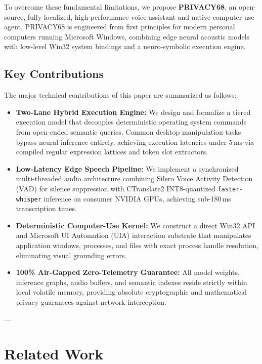 \documentclass[conference]{IEEEtran}
\begin{document}
To overcome these fundamental limitations, we propose \textbf{PRIVACY68}, an open-source, fully localized, high-performance voice assistant and native computer-use agent. PRIVACY68 is engineered from first principles for modern personal computers running Microsoft Windows, combining edge neural acoustic models with low-level Win32 system bindings and a neuro-symbolic execution engine.

\subsection{Key Contributions}
The major technical contributions of this paper are summarized as follows:
\begin{itemize}
    \item \textbf{Two-Lane Hybrid Execution Engine:} We design and formalize a tiered execution model that decouples deterministic operating system commands from open-ended semantic queries. Common desktop manipulation tasks bypass neural inference entirely, achieving execution latencies under 5\,ms via compiled regular expression lattices and token slot extractors.
    \item \textbf{Low-Latency Edge Speech Pipeline:} We implement a synchronized multi-threaded audio architecture combining Silero Voice Activity Detection (VAD) \cite{silerovad2021} for silence suppression with CTranslate2 INT8-quantized \texttt{faster-whisper} \cite{radford2023robust, klein2020ctranslate2} inference on consumer NVIDIA GPUs, achieving sub-180\,ms transcription times.
    \item \textbf{Deterministic Computer-Use Kernel:} We construct a direct Win32 API and Microsoft UI Automation (UIA) interaction substrate that manipulates application windows, processes, and files with exact process handle resolution, eliminating visual grounding errors.
    \item \textbf{100\% Air-Gapped Zero-Telemetry Guarantee:} All model weights, inference graphs, audio buffers, and semantic indexes reside strictly within local volatile memory, providing absolute cryptographic and mathematical privacy guarantees against network interception.
\end{itemize}

---

\section{Related Work}
\end{document}
